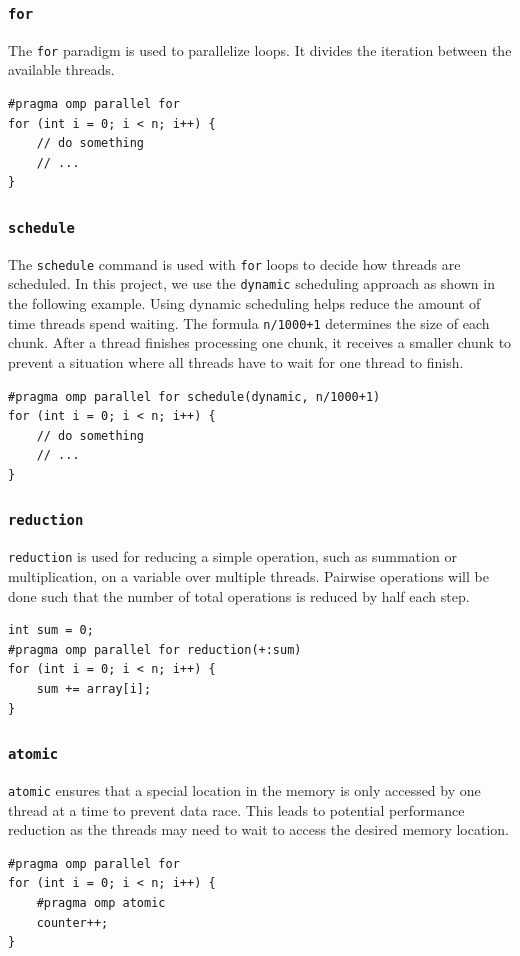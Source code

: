 \documentclass{article}
\begin{document}
\subsubsection{\texttt{for}}
The \texttt{for} paradigm is used to parallelize loops. It divides the iteration between the available threads. 
\begin{verbatim}
#pragma omp parallel for
for (int i = 0; i < n; i++) {
    // do something
    // ...
}
\end{verbatim}

\subsubsection{\texttt{schedule}}
The \texttt{schedule} command is used with \texttt{for} loops to decide how threads are scheduled.
In this project, we use the \texttt{dynamic} scheduling approach as shown in the following example.
Using dynamic scheduling helps reduce the amount of time threads spend waiting.
The formula \texttt{n/1000+1} determines the size of each chunk.
After a thread finishes processing one chunk, it receives a smaller chunk to prevent a situation where all threads have to wait for one thread to finish.
\begin{verbatim}
#pragma omp parallel for schedule(dynamic, n/1000+1)
for (int i = 0; i < n; i++) {
    // do something
    // ...
}
\end{verbatim}

\subsubsection{\texttt{reduction}}
\texttt{reduction} is used for reducing a simple operation, such as summation or multiplication, on a variable over multiple threads. Pairwise operations will be done such that the number of total operations is reduced by half each step.
\begin{verbatim}
int sum = 0;
#pragma omp parallel for reduction(+:sum)
for (int i = 0; i < n; i++) {
    sum += array[i];
}
\end{verbatim}

\subsubsection{\texttt{atomic}}
\texttt{atomic} ensures that a special location in the memory is only accessed by one thread at a time to prevent data race. This leads to potential performance reduction as the threads may need to wait to access the desired memory location.
\begin{verbatim}
#pragma omp parallel for
for (int i = 0; i < n; i++) {
    #pragma omp atomic
    counter++;
}
\end{verbatim}
\end{document}
